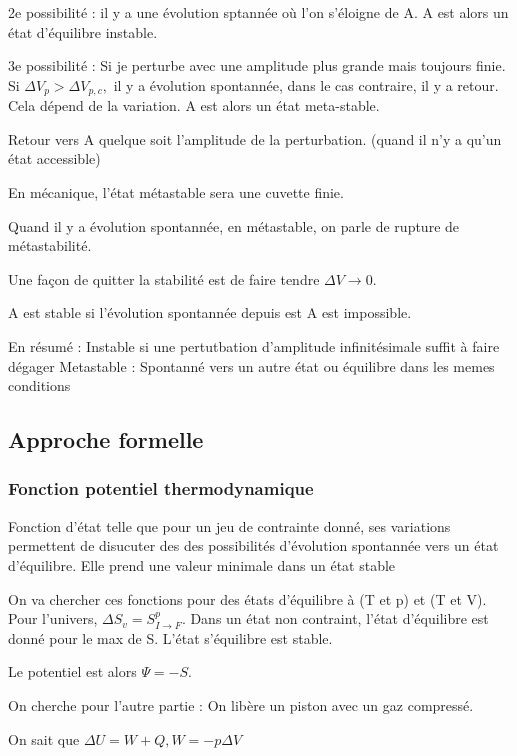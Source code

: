 \documentclass[french]{yLectureNote}
\begin{document}
2e possibilité : il y a une évolution sptannée où l'on s'éloigne de A. A est alors un état d'équilibre instable.

3e possibilité : Si je perturbe avec une amplitude plus grande mais toujours finie. Si $\Delta V_p >\Delta V_{p,c},$ il y a évolution spontannée, dans le cas contraire, il y a retour. Cela dépend de la variation. A est alors un état meta-stable.

\begin{definition}[Stabilité]
    Retour vers A quelque soit l'amplitude de la perturbation. (quand il n'y a qu'un état accessible)
\end{definition}
En mécanique, l'état métastable sera une cuvette finie.

Quand il y a évolution spontannée, en métastable, on parle de rupture de métastabilité.

Une façon de quitter la stabilité est de faire tendre $\Delta V\to 0$.
\begin{definition}[Stabilité]
    A est stable si l'évolution spontannée depuis est A est impossible.
\end{definition}
En résumé : Instable si une pertutbation d'amplitude infinitésimale suffit à faire dégager
Metastable : Spontanné vers un autre état ou équilibre dans les memes conditions
\subsection{Approche formelle}
\subsubsection{Fonction potentiel thermodynamique}
\begin{definition}
    Fonction d'état telle que pour un jeu de contrainte donné, ses variations permettent de disucuter des des possibilités d'évolution spontannée vers un état d'équilibre.
    Elle prend une valeur minimale dans un état stable
\end{definition}
On va chercher ces fonctions pour des états d'équilibre à (T et p) et (T et V).
Pour l'univers, $\Delta S_v = S^p_{I\to F}$. Dans un état non contraint, l'état d'équilibre est donné pour le max de S. L'état s'équilibre est stable.

Le potentiel est alors $\Psi = -S$.

On cherche pour l'autre  partie : On libère un piston avec un gaz compressé.

On sait que $\Delta U = W+Q, W = -p\Delta V$
\end{document}
